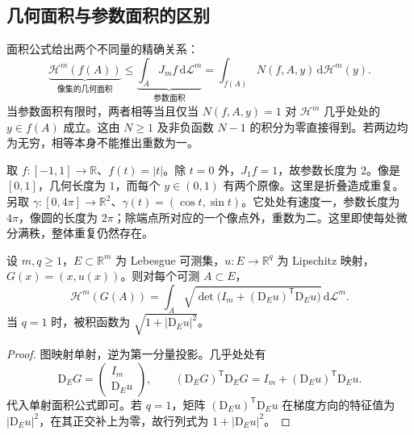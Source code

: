 \subsection{几何面积与参数面积的区别}
\label{g3:subsec:2003:05}
面积公式给出两个不同量的精确关系：
\[
	\underbrace{\mathcal H^m(f(A))}_{\text{像集的几何面积}}
	\le
	\underbrace{\int_AJ_mf\,\mathrm d\mathcal L^m}_{\text{参数面积}}
	=\int_{f(A)}N(f,A,y)\,\mathrm d\mathcal H^m(y).
\]
当参数面积有限时，两者相等当且仅当 \(N(f,A,y)=1\) 对 \(\mathcal H^m\) 几乎处处的 \(y\in f(A)\) 成立。这由 \(N\ge1\) 及非负函数 \(N-1\) 的积分为零直接得到。若两边均为无穷，相等本身不能推出重数为一。

\begin{example}\label{g3:exm:area-fold-and-repetition}
	取 \(f:[-1,1]\to\mathbb R\)、\(f(t)=|t|\)。除 \(t=0\) 外，\(J_1f=1\)，故参数长度为 \(2\)。像是 \([0,1]\)，几何长度为 \(1\)，而每个 \(y\in(0,1)\) 有两个原像。这里是折叠造成重复。另取 \(\gamma:[0,4\pi]\to\mathbb R^2\)、\(\gamma(t)=(\cos t,\sin t)\)。它处处有速度一，参数长度为 \(4\pi\)，像圆的长度为 \(2\pi\)；除端点所对应的一个像点外，重数为二。这里即使每处微分满秩，整体重复仍然存在。
\end{example}

\begin{proposition}\label{g3:prop:lipschitz-graph-area}
	设 \(m,q\ge1\)，\(E\subset\mathbb R^m\) 为 Lebesgue 可测集，\(u:E\to\mathbb R^q\) 为 Lipschitz 映射，\(G(x)=(x,u(x))\)。则对每个可测 \(A\subset E\)，
	\begin{equation}\label{g3:eq:lipschitz-graph-area}
		\mathcal H^m(G(A))
		=\int_A\sqrt{\det\bigl(I_m+(\mathrm D_Eu)^{\mathsf T}\mathrm D_Eu\bigr)}\,\mathrm d\mathcal L^m.
	\end{equation}
	当 \(q=1\) 时，被积函数为 \(\sqrt{1+|\mathrm D_Eu|^2}\)。
\end{proposition}
\begin{proof}
	图映射单射，逆为第一分量投影。几乎处处有
	\[
		\mathrm D_EG=\begin{pmatrix}I_m\\\mathrm D_Eu\end{pmatrix},\qquad
		(\mathrm D_EG)^{\mathsf T}\mathrm D_EG=I_m+(\mathrm D_Eu)^{\mathsf T}\mathrm D_Eu.
	\]
	代入单射面积公式即可。若 \(q=1\)，矩阵 \((\mathrm D_Eu)^{\mathsf T}\mathrm D_Eu\) 在梯度方向的特征值为 \(|\mathrm D_Eu|^2\)，在其正交补上为零，故行列式为 \(1+|\mathrm D_Eu|^2\)。
\end{proof}

